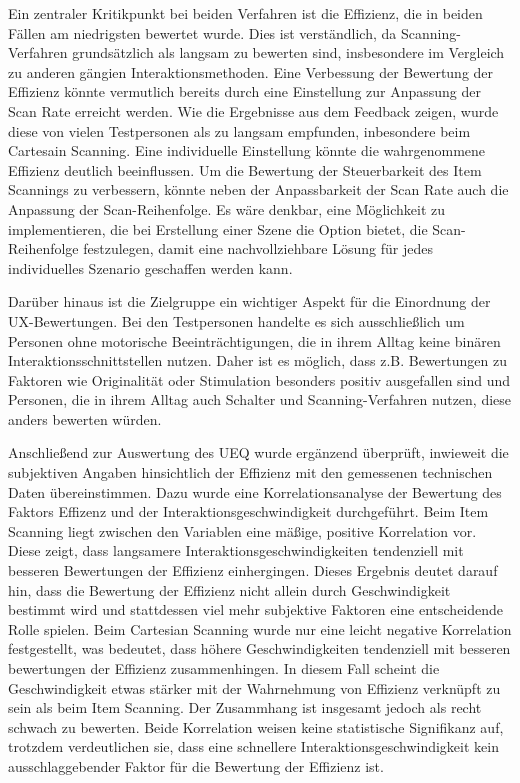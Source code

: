 Ein zentraler Kritikpunkt bei beiden Verfahren ist die Effizienz, die in beiden Fällen am niedrigsten bewertet wurde. Dies ist verständlich, da Scanning-Verfahren grundsätzlich als langsam zu bewerten sind, insbesondere im Vergleich zu anderen gängien Interaktionsmethoden. Eine Verbessung der Bewertung der Effizienz könnte vermutlich bereits durch eine Einstellung zur Anpassung der Scan Rate erreicht werden. Wie die Ergebnisse aus dem Feedback zeigen, wurde diese von vielen Testpersonen als zu langsam empfunden, inbesondere beim Cartesain Scanning. Eine individuelle Einstellung könnte die wahrgenommene Effizienz deutlich beeinflussen. 
Um die Bewertung der Steuerbarkeit des Item Scannings zu verbessern, könnte neben der Anpassbarkeit der Scan Rate auch die Anpassung der Scan-Reihenfolge. Es wäre denkbar, eine Möglichkeit zu implementieren, die bei Erstellung einer Szene die Option bietet, die Scan-Reihenfolge festzulegen, damit eine nachvollziehbare Lösung für jedes individuelles Szenario geschaffen werden kann. 

Darüber hinaus ist die Zielgruppe ein wichtiger Aspekt für die Einordnung der UX-Bewertungen. Bei den Testpersonen handelte es sich ausschließlich um Personen ohne motorische Beeinträchtigungen, die in ihrem Alltag keine binären Interaktionsschnittstellen nutzen. Daher ist es möglich, dass z.B. Bewertungen zu Faktoren wie Originalität oder Stimulation besonders positiv ausgefallen sind und Personen, die in ihrem Alltag auch Schalter und Scanning-Verfahren nutzen, diese anders bewerten würden. 

Anschließend zur Auswertung des UEQ wurde ergänzend überprüft, inwieweit  die subjektiven Angaben hinsichtlich der Effizienz mit den gemessenen technischen Daten übereinstimmen. Dazu wurde eine Korrelationsanalyse der Bewertung des Faktors Effizenz und der Interaktionsgeschwindigkeit durchgeführt. 
Beim Item Scanning liegt zwischen den Variablen eine mäßige, positive Korrelation vor. Diese zeigt, dass langsamere Interaktionsgeschwindigkeiten tendenziell mit besseren Bewertungen der Effizienz einhergingen. Dieses Ergebnis deutet darauf hin, dass die Bewertung der Effizienz nicht allein durch Geschwindigkeit bestimmt wird und stattdessen viel mehr subjektive Faktoren eine entscheidende Rolle spielen.
Beim Cartesian Scanning wurde nur eine leicht negative Korrelation festgestellt, was bedeutet, dass höhere Geschwindigkeiten tendenziell mit besseren bewertungen der Effizienz zusammenhingen. In diesem Fall scheint die Geschwindigkeit etwas stärker mit der Wahrnehmung von Effizienz verknüpft zu sein als beim Item Scanning. Der Zusammhang ist insgesamt jedoch als recht schwach zu bewerten. Beide Korrelation weisen keine statistische Signifikanz auf, trotzdem verdeutlichen sie, dass eine schnellere Interaktionsgeschwindigkeit kein ausschlaggebender Faktor für die Bewertung der Effizienz ist.

